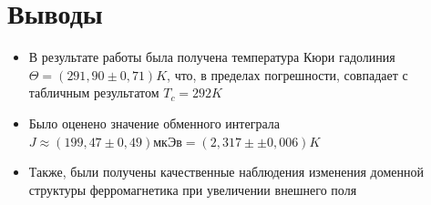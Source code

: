 \documentclass[a4paper,12pt]{article}
\begin{document}
\section*{Выводы}

\begin{itemize}

\item В результате работы была получена температура Кюри гадолиния  \linebreak $\Theta = ( 291,90 \pm 0,71) K$, что, в пределах погрешности, совпадает с табличным результатом $T_c = 292 K$

\item Было оценено значение обменного интеграла $J \approx (199,47 \pm 0,49) мкЭв = (2,317 \pm \pm 0,006) K$

\item Также, были получены качественные наблюдения изменения доменной структуры ферромагнетика при увеличении внешнего поля 

\end{itemize}
\end{document}
